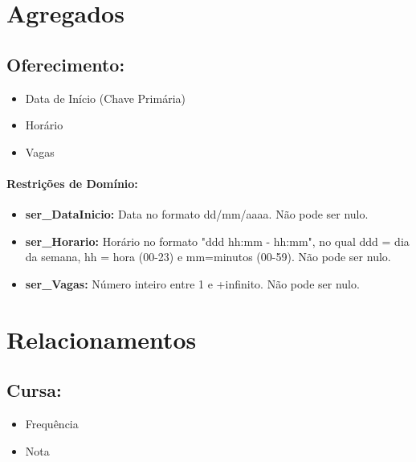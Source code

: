 \documentclass{report}
\begin{document}
\section{Agregados}
\subsection{Oferecimento:}
\begin{itemize}
  \item Data de Início (Chave Primária)
  \item Horário
  \item Vagas
\end{itemize}
\paragraph{Restrições de Domínio:}
\begin{itemize}
  \item \textbf{ser\_DataInicio:} Data no formato dd/mm/aaaa. Não pode ser nulo.
  \item \textbf{ser\_Horario:} Horário no formato "ddd hh:mm - hh:mm", no qual ddd = dia da semana, hh = hora (00-23) e mm=minutos (00-59). Não pode ser nulo.
  \item \textbf{ser\_Vagas:} Número inteiro entre 1 e +infinito. Não pode ser nulo.
\end{itemize}
\section{Relacionamentos}
\subsection{Cursa:}
\begin{itemize}
  \item Frequência
  \item Nota
\end{itemize}
\end{document}
